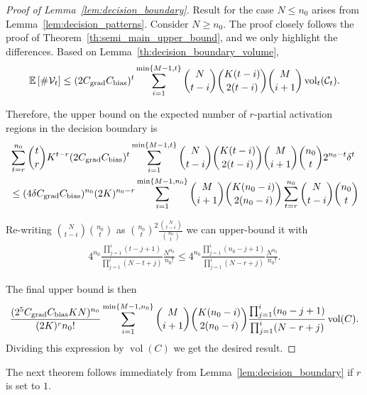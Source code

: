 \documentclass{article}
\theoremstyle{definition}
\newcommand{\cbias}{C_{\text{\normalfont bias}}}
\newcommand{\cgrad}{C_{\text{\normalfont grad}}}
\newcommand{\nin}{n_0}
\newcommand{\vol}{\operatorname{vol}}
\begin{document}
\begin{proof}[Proof of Lemma~\ref{lem:decision_boundary}]
    Result for the case $N \leq \nin$ arises from Lemma~\ref{lem:decision_patterns}.
    Consider $N \geq \nin$.
    The proof closely follows the proof of Theorem~\ref{th:semi_main_upper_bound}, and we only highlight the differences.
    Based on Lemma~\ref{th:decision_boundary_volume},
    \begin{align*}
        \mathbb{E} \left [ \# \mathcal{V}_t \right ] \leq (
        2 \cgrad \cbias)^t \sum_{i = 1} ^{\min\{M - 1, t\}} \binom{N}{t - i} \binom{K(t - i)}{2 (t - i)} \binom{M}{i + 1} \vol_t(\mathcal{C}_t). 
    \end{align*}

    Therefore, the upper bound on the expected number of $r$-partial activation regions in the decision boundary is
    \begin{align*}
        &\sum\limits_{t = r}^{\nin} \binom{t}{r} K^{t-r} (2 \cgrad \cbias)^t \sum_{i = 1}^{\min\{M - 1, t\}} \binom{N}{t - i} \binom{K(t - i)}{2 (t - i)} \binom{M}{i + 1} \binom{\nin}{t} 2^{\nin - t} \delta^t\\
        &\leq (4 \delta \cgrad \cbias)^{\nin} (2 K) ^{\nin - r} \sum_{i = 1}^{\min\{M - 1, \nin\}}  \binom{M}{i + 1}  \binom{K(\nin - i)}{2 (\nin - i)} \sum\limits_{t = r}^{\nin} \binom{N}{t - i}\binom{\nin}{t}
    \end{align*}

    Re-writing $\binom{N}{t - i} \binom{\nin}{t}$ as $\binom{\nin}{t}^2 \frac{\binom{N}{t - i}}{\binom{\nin}{t}}$ we can upper-bound it with
    \begin{align*}
        4^{\nin} \frac{\prod_{j=1}^{i}(t - j + 1)}{\prod_{j=1}^{i}(N - t + j)} \frac{N^{\nin}}{\nin!} \leq 4^{\nin} \frac{\prod_{j=1}^{i}(\nin - j + 1)}{\prod_{j=1}^{i}(N - r + j)} \frac{N^{\nin}}{\nin!}.
    \end{align*}

    The final upper bound is then
    \begin{align*}
        \frac{(2^5 \cgrad \cbias K N)^{\nin}}{(2 K) ^{r} \nin!} \sum_{i = 1}^{\min\{M - 1, \nin\}}  \binom{M}{i + 1}  \binom{K(\nin - i)}{2 (\nin - i)} \frac{\prod_{j=1}^{i}(\nin - j + 1)}{\prod_{j=1}^{i}(N - r + j)} \vol(C).
    \end{align*}
    Dividing this expression by $\vol(C)$ we get the desired result.
\end{proof}

The next theorem follows immediately from Lemma~\ref{lem:decision_boundary} if $r$ is set to $1$. 
\end{document}
